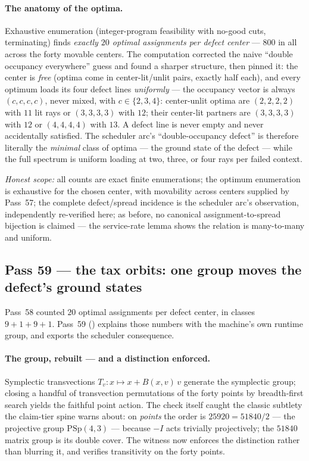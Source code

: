 \documentclass[11pt]{article}
\begin{document}
\paragraph{The anatomy of the optima.}  Exhaustive enumeration (integer-program
feasibility with no-good cuts, terminating) finds \emph{exactly \(20\) optimal
assignments per defect center} --- \(800\) in all across the forty movable
centers.  The computation corrected the naive ``double occupancy everywhere''
guess and found a sharper structure, then pinned it: the center is \emph{free}
(optima come in center-lit/unlit pairs, exactly half each), and every optimum
loads its four defect lines \emph{uniformly} --- the occupancy vector is always
\((c,c,c,c)\), never mixed, with \(c\in\{2,3,4\}\): center-unlit optima are
\((2,2,2,2)\) with \(11\) lit rays or \((3,3,3,3)\) with \(12\); their
center-lit partners are \((3,3,3,3)\) with \(12\) or \((4,4,4,4)\) with \(13\).
A defect line is never empty and never accidentally satisfied.  The scheduler
arc's ``double-occupancy defect'' is therefore literally the \emph{minimal}
class of optima --- the ground state of the defect --- while the full spectrum
is uniform loading at two, three, or four rays per failed context.

\emph{Honest scope:} all counts are exact finite enumerations; the optimum
enumeration is exhaustive for the chosen center, with movability across centers
supplied by Pass~57; the complete defect/spread incidence is the scheduler
arc's observation, independently re-verified here; as before, no canonical
assignment-to-spread bijection is claimed --- the service-rate lemma shows the
relation is many-to-many and uniform.

\subsection{Pass 59 --- the tax orbits: one group moves the defect's ground states}
\label{sec:capstone-fiftynine}

Pass~58 counted \(20\) optimal assignments per defect center, in classes
\(9+1+9+1\).  Pass~59 () explains those numbers
with the machine's own runtime group, and exports the scheduler consequence.

\paragraph{The group, rebuilt --- and a distinction enforced.}  Symplectic
transvections \(T_v\colon x\mapsto x+B(x,v)\,v\) generate the symplectic group;
closing a handful of transvection permutations of the forty points by
breadth-first search yields the faithful point action.  The check itself caught
the classic subtlety the claim-tier spine warns about: on \emph{points} the
order is \(25920 = 51840/2\) --- the projective group \(\mathrm{PSp}(4,3)\) ---
because \(-I\) acts trivially projectively; the \(51840\) matrix group is its
double cover.  The witness now enforces the distinction rather than blurring
it, and verifies transitivity on the forty points.
\end{document}
